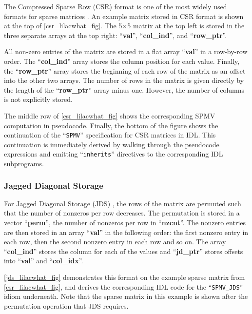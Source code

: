     The Compressed Sparse Row (CSR) format is one of the most widely used
    formats for sparse matrices \cite{doi:10.1137/1.9780898718003}.
    An example matrix stored in CSR format is shown at the top of
    \autoref{csr_lilacwhat_fig}.
    The 5$\times$5 matrix at the top left is stored in the three separate arrays
    at the top right: ``\textbf{val}'', ``\textbf{col\_ind}'', and
    ``\textbf{row\_ptr}''.

    All non-zero entries of the matrix are stored in a flat array
    ``\textbf{val}'' in a row-by-row order.
    The ``\textbf{col\_ind}'' array stores the column position for each value.
    Finally, the ``\textbf{row\_ptr}'' array stores the beginning of each row of
    the matrix as an offset into the other two arrays.
    The number of rows in the matrix is given directly by the length of the
    ``\textbf{row\_ptr}'' array minus one.
    However, the number of columns is not explicitly stored.

    The middle row of \autoref{csr_lilacwhat_fig} shows the corresponding
    SPMV computation in pseudocode.
    Finally, the bottom of the figure shows the continuation of the
    ``{\tt SPMV}'' specification for CSR matrices in IDL.
    This continuation is immediately derived by walking through the pseudocode
    expressions and emitting ``{\tt inherits}'' directives to the corresponding
    IDL subprograms.

\subsubsection{Jagged Diagonal Storage}

    For Jagged Diagonal Storage (JDS) \cite{doi:10.1137/0910073}, the rows of
    the matrix are permuted such that the number of nonzeros per row  decreases.
    The permutation is stored in a vector ``\textbf{perm}'', the number of
    nonzeros per row in ``\textbf{nzcnt}''.
    The nonzero entries are then stored in an array ``\textbf{val}'' in the
    following order: the first nonzero entry in each row, then the second
    nonzero entry in each row and so on.
    The array ``\textbf{col\_ind}'' stores the column for each of the values and
    ``\textbf{jd\_ptr}'' stores offsets into ``\textbf{val}'' and
    ``\textbf{col\_idx}''.

    \autoref{jds_lilacwhat_fig} demonstrates this format on the example sparse
    matrix from \autoref{csr_lilacwhat_fig}, and derives the corresponding IDL
    code for the ``{\tt SPMV\_JDS}'' idiom underneath.
    Note that the sparse matrix in this example is shown after the permutation
    operation that JDS requires.

